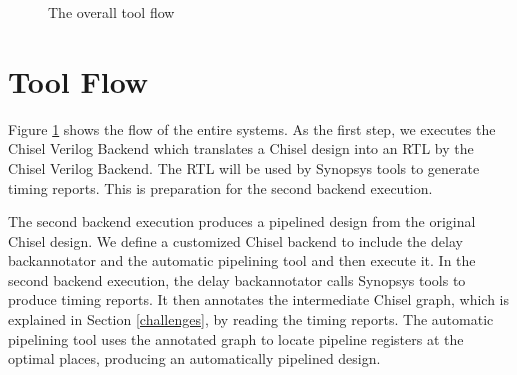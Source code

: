 \begin{figure}
	\centering
    \caption{The overall tool flow}
	\label{toolflow}
\end{figure}

\section{Tool Flow}
Figure \ref{toolflow} shows the flow of the entire systems. As the first step, we executes the Chisel Verilog Backend which translates a Chisel design into an RTL by the Chisel Verilog Backend. The RTL will be used by Synopsys tools to generate timing reports. This is preparation for the second backend execution.

The second backend execution produces a pipelined design from the original Chisel design. We define a customized Chisel backend to include the delay backannotator and the automatic pipelining tool and then execute it. In the second backend execution, the delay backannotator calls Synopsys tools to produce timing reports. It then annotates the intermediate Chisel graph, which is explained in Section \ref{challenges}, by reading the timing reports. The automatic pipelining tool uses the annotated graph to locate pipeline registers at the optimal places, producing an automatically pipelined design.